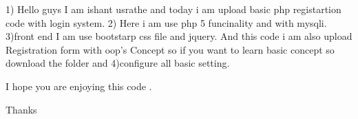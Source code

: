 1) Hello guys I am ishant usrathe and today i am upload basic php registartion code with login system.
2) Here i am use php 5 funcinality and with mysqli.
3)front end I am use bootstarp css file and jquery.
And this code i am also upload Registration form with oop's Concept so if you want to learn basic concept so download the folder and 
4)configure all basic setting.

I hope you are enjoying this code .

Thanks
